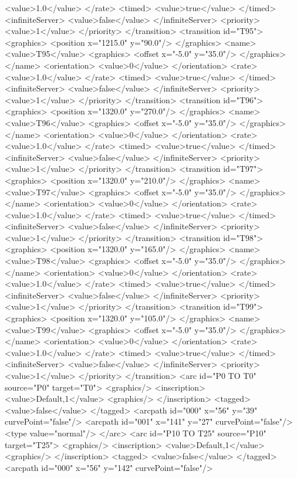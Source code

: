 <value>1.0</value>
</rate>
<timed>
<value>true</value>
</timed>
<infiniteServer>
<value>false</value>
</infiniteServer>
<priority>
<value>1</value>
</priority>
</transition>
<transition id="T95">
<graphics>
<position x="1215.0" y="90.0"/>
</graphics>
<name>
<value>T95</value>
<graphics>
<offset x="-5.0" y="35.0"/>
</graphics>
</name>
<orientation>
<value>0</value>
</orientation>
<rate>
<value>1.0</value>
</rate>
<timed>
<value>true</value>
</timed>
<infiniteServer>
<value>false</value>
</infiniteServer>
<priority>
<value>1</value>
</priority>
</transition>
<transition id="T96">
<graphics>
<position x="1320.0" y="270.0"/>
</graphics>
<name>
<value>T96</value>
<graphics>
<offset x="-5.0" y="35.0"/>
</graphics>
</name>
<orientation>
<value>0</value>
</orientation>
<rate>
<value>1.0</value>
</rate>
<timed>
<value>true</value>
</timed>
<infiniteServer>
<value>false</value>
</infiniteServer>
<priority>
<value>1</value>
</priority>
</transition>
<transition id="T97">
<graphics>
<position x="1320.0" y="210.0"/>
</graphics>
<name>
<value>T97</value>
<graphics>
<offset x="-5.0" y="35.0"/>
</graphics>
</name>
<orientation>
<value>0</value>
</orientation>
<rate>
<value>1.0</value>
</rate>
<timed>
<value>true</value>
</timed>
<infiniteServer>
<value>false</value>
</infiniteServer>
<priority>
<value>1</value>
</priority>
</transition>
<transition id="T98">
<graphics>
<position x="1320.0" y="165.0"/>
</graphics>
<name>
<value>T98</value>
<graphics>
<offset x="-5.0" y="35.0"/>
</graphics>
</name>
<orientation>
<value>0</value>
</orientation>
<rate>
<value>1.0</value>
</rate>
<timed>
<value>true</value>
</timed>
<infiniteServer>
<value>false</value>
</infiniteServer>
<priority>
<value>1</value>
</priority>
</transition>
<transition id="T99">
<graphics>
<position x="1320.0" y="105.0"/>
</graphics>
<name>
<value>T99</value>
<graphics>
<offset x="-5.0" y="35.0"/>
</graphics>
</name>
<orientation>
<value>0</value>
</orientation>
<rate>
<value>1.0</value>
</rate>
<timed>
<value>true</value>
</timed>
<infiniteServer>
<value>false</value>
</infiniteServer>
<priority>
<value>1</value>
</priority>
</transition>
<arc id="P0 TO T0" source="P0" target="T0">
<graphics/>
<inscription>
<value>Default,1</value>
<graphics/>
</inscription>
<tagged>
<value>false</value>
</tagged>
<arcpath id="000" x="56" y="39" curvePoint="false"/>
<arcpath id="001" x="141" y="27" curvePoint="false"/>
<type value="normal"/>
</arc>
<arc id="P10 TO T25" source="P10" target="T25">
<graphics/>
<inscription>
<value>Default,1</value>
<graphics/>
</inscription>
<tagged>
<value>false</value>
</tagged>
<arcpath id="000" x="56" y="142" curvePoint="false"/>
